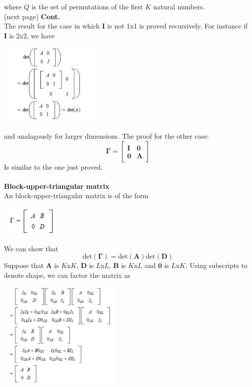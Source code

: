 \documentclass{report}
\begin{document}
where $Q$ is the set of permutations of the first $K$ natural numbers.\\
(next page)\newpage
\noindent\textbf{Cont.}\\
The result for the case in which $\bm I$ is not 1x1 is proved recursively. For instance if $\bm I$ is 2x2, we have
\begin{center}
\includegraphics[width=5cm]{123}
\end{center}
and analagously for larger dimensions. The proof for the other case:
\begin{equation*}
\bm\Gamma=\left[\begin{array}{cc}\bm I&\bm 0\\\bm 0&\bm A\end{array}\right]
\end{equation*}
Is similar to the one just proved.\\
\vspace{1mm}\\
\textbf{Block-upper-triangular matrix}\\
An block-upper-triangular matrix is of the form
\begin{center}
\includegraphics[width=3cm]{124}
\end{center}
We can show that
\begin{equation*}
\text{det}(\bm\Gamma)=\text{det}(\bm A)\text{det}(\bm D)
\end{equation*}
Suppose that $\bm A$ is $K$x$K$, $\bm D$ is $L$x$L$, $\bm B$ is $K$x$L$ and $\bm 0$ is $L$x$K$. Using subscripts to denote shape, we can factor the matrix as
\begin{center}
\includegraphics[width=6cm]{125}
\end{center}
\end{document}
